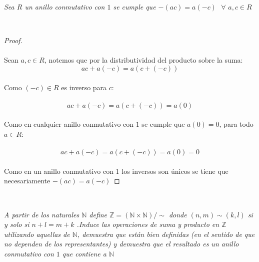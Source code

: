 \documentclass[11pt,letterpaper]{article}
\newcommand{\N}{\mathbb{N}}
\newcommand{\Z}{\mathbb{Z}}
\begin{document}
\begin{tcolorbox}[
	title = \textcolor{black}{\textcolor{white}{Lema 1}},]
\textit{Sea $R$ un anillo conmutativo con $1$ se cumple que $-(ac)=a(-c)\,\,\,\,\forall\,\,a,c\in R$
}
\end{tcolorbox}\,\\
\begin{proof}\,\\
    \,\\
    Sean $a,c\in R$, notemos que por la distributividad del producto sobre la suma:\,\\
        \begin{equation*}
           ac+a(-c)=a(c+(-c))
        \end{equation*}\,\\
        Como $(-c)\in R$ es inverso para $c$:\,\\
        \,\\
        \begin{equation*}
            ac+a(-c)=a(c+(-c))=a(0)
        \end{equation*}\,\\
        Como en cualquier anillo conmutativo con $1$ se cumple que $a(0)=0$, para todo $a\in R$:\,\\
        \,\\
        \begin{equation*}
            ac+a(-c)=a(c+(-c))=a(0)=0
        \end{equation*}\,\\
        Como en un anillo conmutativo con $1$ los inversos son \'unicos se tiene que necesariamente $-(ac)=a(-c)$
\end{proof}\,\\
\newpage
\begin{tcolorbox}[
	title = \textcolor{black}{\textcolor{white}{Problema 1}},]
\textit{A partir de los naturales $\N$ define $\Z=(\N\times \N)/\sim$ donde $(n,m)\sim(k,l)$ si y solo si $n+l=m+k$
.Induce las operaciones de suma y producto en $\Z$ utilizando aquellas de $\N$, demuestra que est\'an bien definidas 
(en el sentido de que no dependen de los representantes) y demuestra que el resultado es un anillo conmutativo con $1$ que 
contiene  a $\N$ 
}
\end{tcolorbox}\,\\
\end{document}
